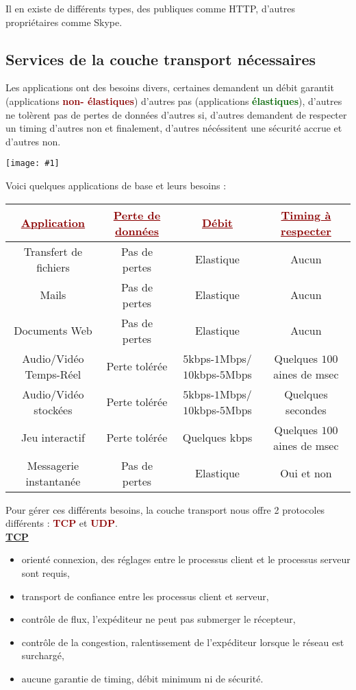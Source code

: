 \documentclass{article}
\newcommand{\dred}[1]{\textcolor{darkred}{\textbf{#1}}}
\newcommand{\dgre}[1]{\textcolor{darkgreen}{\textbf{#1}}}
\newcommand{\imgR}[2]{\begin{center}\texttt{[image: \#1]}\end{center}}
\begin{document}
\noindent Il en existe de différents types, des publiques comme HTTP, d'autres propriétaires comme Skype.

\subsection{Services de la couche transport nécessaires}

Les applications ont des besoins divers, certaines demandent un débit garantit (applications \dred{non-
élastiques}) d'autres pas (applications \dgre{élastiques}), d'autres ne tolèrent pas de pertes de données 
d'autres si, d'autres demandent de respecter un timing d'autres non et finalement, d'autres nécéssitent une 
sécurité accrue et d'autres non.

\imgR{CN_014.png}{250}

Voici quelques applications de base et leurs besoins :

\begin{center}
	\begin{tabular}{|*{4}{c|}}
	\hline
	\dred{\underline{Application}} & \dred{\underline{Perte de données}} & \dred{\underline{Débit}} & 
	\dred{\underline{Timing à respecter}} \\	 
	\hline
	Transfert de fichiers & Pas de pertes & Elastique & Aucun \\
 	\hline
	Mails & Pas de pertes & Elastique & Aucun \\
	\hline
	Documents Web & Pas de pertes & Elastique & Aucun \\
	\hline
	Audio/Vidéo Temps-Réel & Perte tolérée & $5$kbps-$1$Mbps/$10$kbps-$5$Mbps & Quelques $100$aines de msec\\
	\hline
	Audio/Vidéo stockées & Perte tolérée & $5$kbps-$1$Mbps/$10$kbps-$5$Mbps & Quelques secondes \\
	\hline
	Jeu interactif & Perte tolérée & Quelques kbps & Quelques $100$aines de msec\\
	\hline
	Messagerie instantanée & Pas de pertes & Elastique & Oui et non\\
	\hline
	\end{tabular}
\end{center}

Pour gérer ces différents besoins, la couche transport nous offre 2 protocoles différents : \dred{TCP} et 
\dred{UDP}. \\
$ $ \\
$ $ \\

\underline{\textbf{TCP}}
\begin{itemize}
\item orienté connexion, des réglages entre le processus client et le processus serveur sont requis,
\item transport de confiance entre les processus client et serveur,
\item contrôle de flux, l'expéditeur ne peut pas submerger le récepteur,
\item contrôle de la congestion, ralentissement de l'expéditeur lorsque le réseau est surchargé,
\item aucune garantie de timing, débit minimum ni de sécurité.
\end{itemize}
\end{document}
